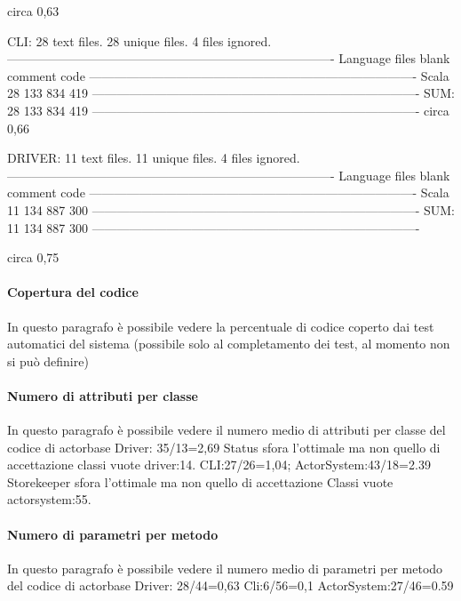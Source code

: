 \documentclass{scalatekids-article}
\begin{document}
      circa 0,63

CLI:
28 text files.
28 unique files.
4 files ignored.
-------------------------------------------------------------------------------
Language                     files          blank        comment           code
-------------------------------------------------------------------------------
Scala                           28            133            834            419
-------------------------------------------------------------------------------
SUM:                            28            133            834            419
-------------------------------------------------------------------------------
circa 0,66

DRIVER:
      11 text files.
      11 unique files.
      4 files ignored.
      -------------------------------------------------------------------------------
      Language                     files          blank        comment           code
      -------------------------------------------------------------------------------
      Scala                           11            134            887            300
      -------------------------------------------------------------------------------
      SUM:                            11            134            887            300
      -------------------------------------------------------------------------------
      
      circa 0,75

\paragraph{Copertura del codice}
In questo paragrafo è possibile vedere la percentuale di codice coperto dai 
test automatici del sistema (possibile solo al completamento dei test, al momento non si può definire)

\paragraph{Numero di attributi per classe}
In questo paragrafo è possibile vedere il numero medio di attributi per 
classe del codice di actorbase
Driver: 35/13=2,69 Status sfora l'ottimale ma non quello di accettazione
classi vuote driver:14.
CLI:27/26=1,04;
ActorSystem:43/18=2.39 Storekeeper sfora l'ottimale ma non quello di accettazione
Classi vuote actorsystem:55.

\paragraph{Numero di parametri per metodo}
In questo paragrafo è possibile vedere il numero medio di parametri per 
metodo del codice di actorbase 
Driver: 28/44=0,63
Cli:6/56=0,1
ActorSystem:27/46=0.59
\end{document}
